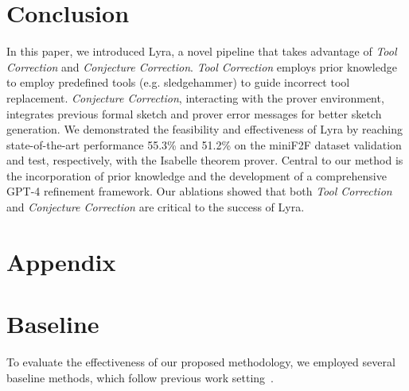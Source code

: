 \documentclass{article} \usepackage{iclr2024_conference,times}
\def\methodOneFull{\textit{Tool Correction}\xspace}
\def\methodTwoFull{\textit{Conjecture Correction}\xspace}
\def\fullname{Lyra\xspace}
\def\shortname{Lyra\xspace}
\begin{document}
\section{Conclusion}
In this paper, we introduced \fullname, a novel pipeline that takes advantage of \methodOneFull and \methodTwoFull. \methodOneFull employs prior knowledge to employ predefined tools (e.g. sledgehammer) to guide incorrect tool replacement. \methodTwoFull, interacting with the prover environment, integrates previous formal sketch and prover error messages for better sketch generation.  We demonstrated the feasibility and effectiveness of \shortname by reaching state-of-the-art performance 55.3\% and 51.2\% on the miniF2F dataset validation and test, respectively, with the Isabelle theorem prover. Central to our method is the incorporation of prior knowledge and the development of a comprehensive GPT-4 refinement framework. Our ablations showed that both \methodOneFull and \methodTwoFull are critical to the success of \shortname.



\nocite{*}



\clearpage

\newpage
\appendix
\section*{\Large{Appendix}}






\section{Baseline}
To evaluate the effectiveness of our proposed methodology, we employed several baseline methods, which follow previous work setting~\citep{jiang2023draft,zhao2023decomposing}.
\end{document}
